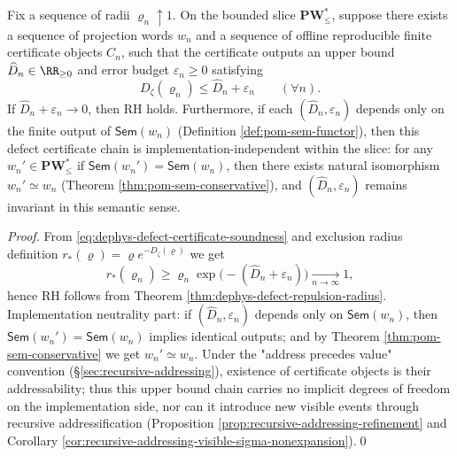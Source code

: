 \begin{theorem}\label{thm:dephys-impl-independent-defect-certificate}
Fix a sequence of radii \(\varrho_n\uparrow 1\).
On the bounded slice \(\mathbf{PW}^{\ast}_{\le}\), suppose there exists a sequence of projection words \(w_n\) and a sequence of offline reproducible finite certificate objects \(C_n\), such that the certificate outputs an upper bound \(\widehat D_n\in\RR_{\ge 0}\) and error budget \(\varepsilon_n\ge 0\) satisfying
\begin{equation}\label{eq:dephys-defect-certificate-soundness}
D_{\zeta}(\varrho_n)\le \widehat D_n+\varepsilon_n\qquad(\forall n).
\end{equation}
If \(\widehat D_n+\varepsilon_n\to 0\), then RH holds.
Furthermore, if each \((\widehat D_n,\varepsilon_n)\) depends only on the finite output of \(\mathsf{Sem}(w_n)\) (Definition \ref{def:pom-sem-functor}), then this defect certificate chain is implementation-independent within the slice: for any \(w_n'\in\mathbf{PW}^{\ast}_{\le}\) if \(\mathsf{Sem}(w_n')=\mathsf{Sem}(w_n)\), then there exists natural isomorphism \(w_n'\simeq w_n\) (Theorem \ref{thm:pom-sem-conservative}), and \((\widehat D_n,\varepsilon_n)\) remains invariant in this semantic sense.
\end{theorem}

\begin{proof}
From \eqref{eq:dephys-defect-certificate-soundness} and exclusion radius definition \(r_{\ast}(\varrho)=\varrho e^{-D_{\zeta}(\varrho)}\) we get
\[
r_{\ast}(\varrho_n)\ge \varrho_n\exp\!\bigl(-(\widehat D_n+\varepsilon_n)\bigr)\xrightarrow[n\to\infty]{}1,
\]
hence RH follows from Theorem \ref{thm:dephys-defect-repulsion-radius}.
Implementation neutrality part: if \((\widehat D_n,\varepsilon_n)\) depends only on \(\mathsf{Sem}(w_n)\), then \(\mathsf{Sem}(w_n')=\mathsf{Sem}(w_n)\) implies identical outputs; and by Theorem \ref{thm:pom-sem-conservative} we get \(w_n'\simeq w_n\).
Under the "address precedes value" convention (\S\ref{sec:recursive-addressing}), existence of certificate objects is their addressability; thus this upper bound chain carries no implicit degrees of freedom on the implementation side,
nor can it introduce new visible events through recursive addressification (Proposition \ref{prop:recursive-addressing-refinement} and Corollary \ref{cor:recursive-addressing-visible-sigma-nonexpansion}).\qed
\end{proof}

